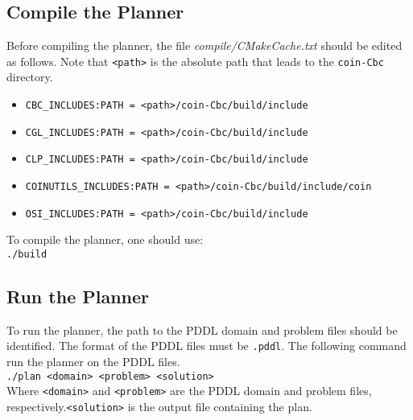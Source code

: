 \subsection{Compile the Planner}
Before compiling the planner, the file \textit{compile/CMakeCache.txt} should be edited as follows. Note that \texttt{<path>} is the absolute path that leads to the \texttt{coin-Cbc} directory.
\begin{itemize}
\item \texttt{CBC\_INCLUDES:PATH = <path>/coin-Cbc/build/include}
\item \texttt{CGL\_INCLUDES:PATH = <path>/coin-Cbc/build/include}
\item \texttt{CLP\_INCLUDES:PATH = <path>/coin-Cbc/build/include}
\item \texttt{COINUTILS\_INCLUDES:PATH = <path>/coin-Cbc/build/include/coin}
\item \texttt{OSI\_INCLUDES:PATH = <path>/coin-Cbc/build/include}
\end{itemize}

To compile the planner, one should use:\\
\texttt{./build}


\subsection{Run the Planner}
To run the planner, the path to the PDDL domain and problem files should be identified. The format of the PDDL files must be \texttt{.pddl}. The following command run the planner on the PDDL files.\\
\texttt{./plan <domain> <problem> <solution>}\\

Where \texttt{<domain>} and \texttt{<problem>} are the PDDL domain and problem files, respectively.\texttt{<solution>} is the output file containing the plan.
